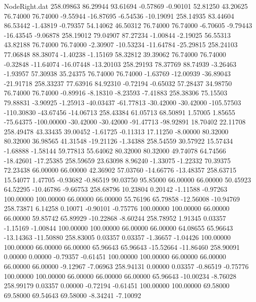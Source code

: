 \begin{filecontents}{NodeRight.dat}
 258.09863   86.29944   93.61694    -0.57869   -0.90101   52.81250   43.20625   76.74000   76.74000   -9.55944  -16.87695   -6.54536  -10.19091
 258.14935   83.44604   86.53442    -1.43819   -0.79357   54.14062   46.50312   76.74000   76.74000   -6.70605   -9.79443  -16.43545   -9.06878
 258.19012   79.04907   87.27234    -1.00844   -2.19025   56.55313   43.82188   76.74000   76.74000   -2.30907  -10.53234  -11.64784  -25.29815
 258.24103   77.06848   88.38074    -1.40238   -1.15169   58.32812   39.39062   76.74000   76.74000   -0.32848  -11.64074  -16.07448  -13.20103
 258.29193   78.37769   88.74939    -3.26463   -1.93957   57.30938   35.24375   76.74000   76.74000   -1.63769  -12.00939  -36.89043  -21.91718
 258.33237   77.63916   84.92310    -0.72194   -0.65032   57.28437   34.98750   76.74000   76.74000   -0.89916   -8.18310   -8.23593   -7.41883
 258.38306   75.15503   79.88831    -3.90925   -1.25913  -40.03437  -61.77813  -30.42000  -30.42000 -105.57503 -110.30830  -43.67456  -14.06713
 258.43384   61.05713   68.50891     1.57005    1.85655  -75.64375 -100.00000  -30.42000  -30.42000  -91.47713  -98.92891   18.70402   22.11708
 258.49478   43.33435   39.00452    -1.61725   -0.11313   17.11250   -8.00000   80.32000   80.32000   36.98565   41.31548  -19.21126   -1.34388
 258.54559   30.57922   15.57434    -1.68888   -1.58144   59.77813   55.64062   80.32000   80.32000   49.74078   64.74566  -18.42601  -17.25385
 258.59659   23.63098    8.96240    -1.33075   -1.22332   70.39375   72.23438   66.00000   66.00000   42.36902   57.03760  -14.66776  -13.48357
 258.63715   15.54077    1.47705    -0.93682   -0.86519   90.03750   95.85000   66.00000   66.00000   50.45923   64.52295  -10.46786   -9.66753
 258.68796   10.23804    0.20142    -1.11588   -0.97263  100.00000  100.00000   66.00000   66.00000   55.76196   65.79858  -12.56008  -10.94769
 258.73871    6.14258    0.10071    -0.90101   -0.75776  100.00000  100.00000   66.00000   66.00000   59.85742   65.89929  -10.22868   -8.60244
 258.78952    1.91345    0.03357    -1.15169   -1.00844  100.00000  100.00000   66.00000   66.00000   64.08655   65.96643  -13.14363  -11.50880
 258.83005    0.03357    0.03357    -1.36657   -1.04426  100.00000  100.00000   66.00000   66.00000   65.96643   65.96643  -15.52664  -11.86460
 258.90091    0.00000    0.00000    -0.79357   -0.61451  100.00000  100.00000   66.00000   66.00000   66.00000   66.00000   -9.12967   -7.06963
 258.94131    0.00000    0.03357    -0.86519   -0.75776  100.00000  100.00000   66.00000   66.00000   66.00000   65.96643  -10.00234   -8.76028
 258.99179    0.03357    0.00000    -0.72194   -0.61451  100.00000  100.00000   69.58000   69.58000   69.54643   69.58000   -8.34241   -7.10092

\end{filecontents}
